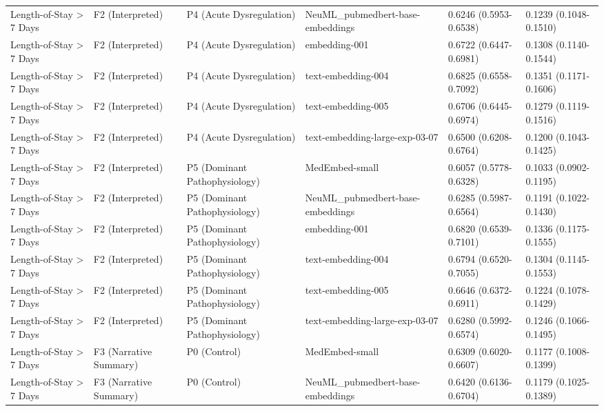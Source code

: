 \begin{tabular}{llllll}
Length-of-Stay \textgreater{} 7 Days & F2 (Interpreted) & P4 (Acute Dysregulation) & NeuML\_pubmedbert-base-embeddings & 0.6246 (0.5953-0.6538) & 0.1239 (0.1048-0.1510) \\
Length-of-Stay \textgreater{} 7 Days & F2 (Interpreted) & P4 (Acute Dysregulation) & embedding-001 & 0.6722 (0.6447-0.6981) & 0.1308 (0.1140-0.1544) \\
Length-of-Stay \textgreater{} 7 Days & F2 (Interpreted) & P4 (Acute Dysregulation) & text-embedding-004 & 0.6825 (0.6558-0.7092) & 0.1351 (0.1171-0.1606) \\
Length-of-Stay \textgreater{} 7 Days & F2 (Interpreted) & P4 (Acute Dysregulation) & text-embedding-005 & 0.6706 (0.6445-0.6974) & 0.1279 (0.1119-0.1516) \\
Length-of-Stay \textgreater{} 7 Days & F2 (Interpreted) & P4 (Acute Dysregulation) & text-embedding-large-exp-03-07 & 0.6500 (0.6208-0.6764) & 0.1200 (0.1043-0.1425) \\
Length-of-Stay \textgreater{} 7 Days & F2 (Interpreted) & P5 (Dominant Pathophysiology) & MedEmbed-small & 0.6057 (0.5778-0.6328) & 0.1033 (0.0902-0.1195) \\
Length-of-Stay \textgreater{} 7 Days & F2 (Interpreted) & P5 (Dominant Pathophysiology) & NeuML\_pubmedbert-base-embeddings & 0.6285 (0.5987-0.6564) & 0.1191 (0.1022-0.1430) \\
Length-of-Stay \textgreater{} 7 Days & F2 (Interpreted) & P5 (Dominant Pathophysiology) & embedding-001 & 0.6820 (0.6539-0.7101) & 0.1336 (0.1175-0.1555) \\
Length-of-Stay \textgreater{} 7 Days & F2 (Interpreted) & P5 (Dominant Pathophysiology) & text-embedding-004 & 0.6794 (0.6520-0.7055) & 0.1304 (0.1145-0.1553) \\
Length-of-Stay \textgreater{} 7 Days & F2 (Interpreted) & P5 (Dominant Pathophysiology) & text-embedding-005 & 0.6646 (0.6372-0.6911) & 0.1224 (0.1078-0.1429) \\
Length-of-Stay \textgreater{} 7 Days & F2 (Interpreted) & P5 (Dominant Pathophysiology) & text-embedding-large-exp-03-07 & 0.6280 (0.5992-0.6574) & 0.1246 (0.1066-0.1495) \\
Length-of-Stay \textgreater{} 7 Days & F3 (Narrative Summary) & P0 (Control) & MedEmbed-small & 0.6309 (0.6020-0.6607) & 0.1177 (0.1008-0.1399) \\
Length-of-Stay \textgreater{} 7 Days & F3 (Narrative Summary) & P0 (Control) & NeuML\_pubmedbert-base-embeddings & 0.6420 (0.6136-0.6704) & 0.1179 (0.1025-0.1389) \\

\end{tabular}
